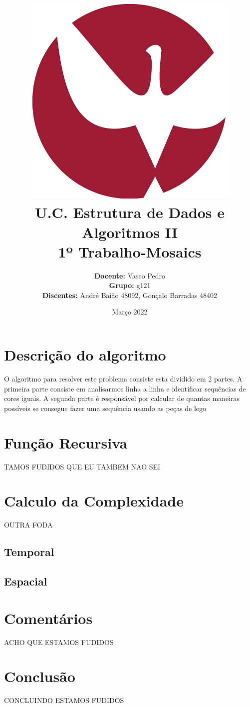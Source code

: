 \documentclass{article}
\title{ \includegraphics[scale=0.3]{imagens/uevora.png}\\
U.C. Estrutura de Dados e Algoritmos II\\
\textbf{1º Trabalho-Mosaics}}
\author{
\textbf{Docente: }Vasco Pedro\\
\textbf{Grupo: } g121\\
\textbf{Discentes: } André Baião 48092, Gonçalo Barradas 48402\\
}
\date{Março 2022}
\begin{document}
\maketitle
\clearpage
\renewcommand{\contentsname}{Índice}
\thispagestyle{indice}
\tableofcontents
\clearpage
\setcounter{page}{1}
\section{Descrição do algoritmo}

O algoritmo para resolver este problema consiste esta dividido em 2 partes.
A primeira parte consiste em analisarmos  linha a linha e identificar sequências de cores iguais.
A segunda parte  é responsável por calcular de quantas maneiras possíveis se consegue fazer uma sequência usando as peças de lego

\section{Função Recursiva}
TAMOS FUDIDOS QUE EU TAMBEM NAO SEI

\section{Calculo da Complexidade}
OUTRA FODA
\subsection{Temporal}
\subsection{Espacial}
\section{Comentários}
ACHO QUE ESTAMOS FUDIDOS
\section{Conclusão}
CONCLUINDO ESTAMOS FUDIDOS
\end{document}
